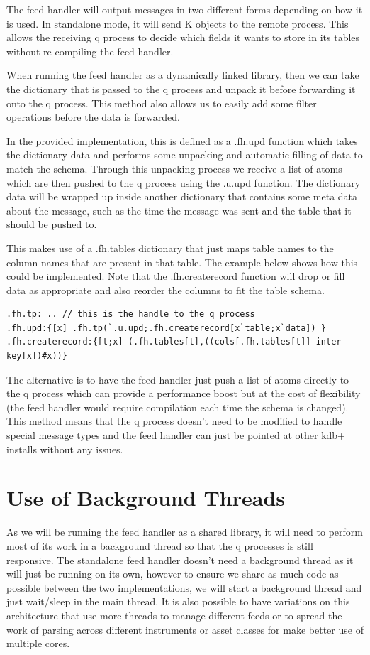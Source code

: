 The feed handler will output messages in two different forms depending on how it is used.
In standalone mode, it will send K objects to the remote process. This allows the receiving
q process to decide which fields it wants to store in its tables without re-compiling the
feed handler.

When running the feed handler as a dynamically linked library, then we can take the dictionary
that is passed to the q process and unpack it before forwarding it onto the q process. This
method also allows us to easily add some filter operations before the data is forwarded.

In the provided implementation, this is defined as a .fh.upd function which takes the dictionary
data and performs some unpacking and automatic filling of data to match the schema. Through this
unpacking process we receive a list of atoms which are then pushed to the q process using the
.u.upd function. The dictionary data will be wrapped up inside another dictionary that contains
some meta data about the message, such as the time the message was sent and the table that it
should be pushed to.

This makes use of a .fh.tables dictionary that just maps table names to the column names that
are present in that table. The example below shows how this could be implemented. Note that the
.fh.createrecord function will drop or fill data as appropriate and also reorder the columns to
fit the table schema.

\begin{lstlisting}
.fh.tp: .. // this is the handle to the q process
.fh.upd:{[x] .fh.tp(`.u.upd;.fh.createrecord[x`table;x`data]) }
.fh.createrecord:{[t;x] (.fh.tables[t],((cols[.fh.tables[t]] inter key[x])#x))}
\end{lstlisting}

The alternative is to have the feed handler just push a list of atoms directly to the q process
which can provide a performance boost but at the cost of flexibility (the feed handler would
require compilation each time the schema is changed). This method means that the q process doesn't
need to be modified to handle special message types and the feed handler can just be pointed at other
kdb+ installs without any issues.

\section{Use of Background Threads}

As we will be running the feed handler as a shared library, it will need to
perform most of its work in a background thread so that the q processes is
still responsive. The standalone feed handler doesn't need a background thread
as it will just be running on its own, however to ensure we share as much code
as possible between the two implementations, we will start a background thread
and just wait/sleep in the main thread. It is also possible to have variations
on this architecture that use more threads to manage different feeds or to spread
the work of parsing across different instruments or asset classes for make better
use of multiple cores.

